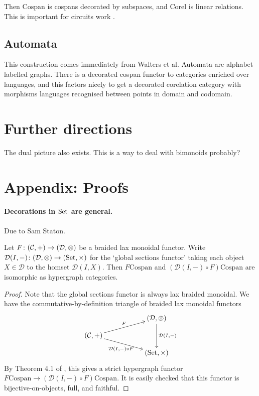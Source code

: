 Then $\mathrm{Cospan}$ is cospans decorated by subspaces, and $\mathrm{Corel}$
is linear relations. This is important for circuits work \cite{BF,BSZ}.

\subsection{Automata}
This construction comes immediately from Walters et al. Automata are alphabet
labelled graphs. There is a decorated cospan functor to categories enriched over
languages, and this factors nicely to get a decorated corelation category with
morphisms languages recognised between points in domain and codomain.


\section{Further directions}

The dual picture also exists. This is a way to deal with bimonoids probably?

\appendix

\section{Appendix: Proofs} \label{sec:proofs}

\paragraph{Decorations in $\mathrm{Set}$ are general.} \label{ssec.setdecorations}

Due to Sam Staton.

\begin{proposition} \label{prop.setdecorations}
  Let $F{\colon} (\mathcal C, +) \to (\mathcal D, \otimes)$ be a braided lax monoidal
  functor. Write $\mathcal D(I,-){\colon} (\mathcal D, \otimes) \to (\mathrm{Set},
  \times)$ for the `global sections functor' taking each object $X \in \mathcal
  D$ to the homset $\mathcal D(I,X)$. Then $F\mathrm{Cospan}$ and $(\mathcal
  D(I,-)\circ F)\mathrm{Cospan}$ are isomorphic as hypergraph categories.
\end{proposition}
\begin{proof}
  Note that the global sections functor is always lax braided monoidal. We have
  the commutative-by-definition triangle of braided lax monoidal functors
  \[
    \xymatrixrowsep{2ex}
    \xymatrix{
      && (\mathcal D,\otimes) \ar[dd]^{\mathcal D(I,-)} \\
      (\mathcal C,+) \ar[urr]^{F} \ar[drr]_{\mathcal D(I,-)\circ F} \\
      && (\Set, \times)
    }
  \]
  By Theorem 4.1 of \cite{F}, this gives a strict hypergraph functor
  $F\mathrm{Cospan} \to (\mathcal D(I,-)\circ F)\mathrm{Cospan}$. It is easily
  checked that this functor is bijective-on-objects, full, and faithful.
\end{proof}

